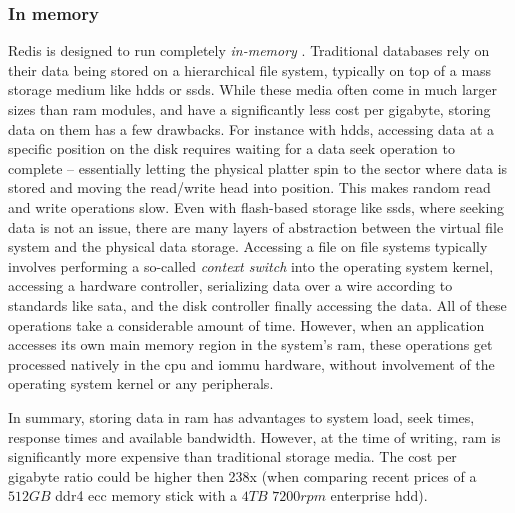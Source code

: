 \subsubsection*{In memory}
Redis is designed to run completely \textit{in-memory}
\parencite{redis:introduction}.  Traditional databases rely on their data being
stored on a hierarchical file system, typically on top of a mass storage medium
like \glspl{hdd} or \glspl{ssd}. While these media often come in
much larger sizes than \gls{ram} modules, and have a significantly less cost
per gigabyte, storing data on them has a few drawbacks.
For instance with \glspl{hdd}, accessing data at a specific position on the
disk requires waiting for a data seek operation to complete -- essentially
letting the physical platter spin to the sector where data is stored and moving
the read/write head into position. This makes random read and write operations
slow. Even with flash-based storage like \glspl{ssd}, where seeking data is not
an issue, there are many layers of abstraction between the virtual file system
and the physical data storage. Accessing a file on file systems typically
involves performing a so-called \textit{context switch} into the operating
system kernel, accessing a hardware controller, serializing data over a wire
according to standards like \acrshort{sata}, and the disk controller finally
accessing the data. All of these operations take a considerable amount of time.
\parencite{edgar}
However, when an application accesses its own main memory region in the system's
\gls{ram}, these operations get processed natively in the \gls{cpu} and
\gls{iommu} hardware, without involvement of the operating system kernel or any
peripherals.

In summary, storing data in \gls{ram} has advantages to system load, seek times,
response times and available bandwidth. However, at the time of writing,
\gls{ram} is significantly more expensive than traditional storage media. The
cost per gigabyte ratio could be higher then 238x (when comparing recent prices
of a $512GB$ \acrshort{ddr4} \acrshort{ecc} memory stick with a $4TB$ $7200rpm$
enterprise \gls{hdd}).

